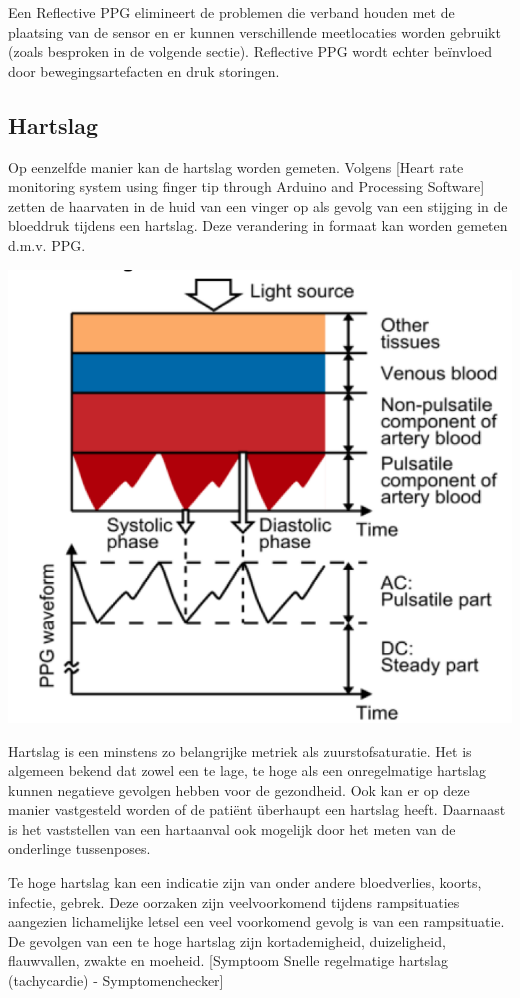 \documentclass[11pt]{article}
\begin{document}
    Een Reflective PPG elimineert de problemen die verband houden met de plaatsing van de sensor en er kunnen verschillende meetlocaties worden gebruikt (zoals besproken in de volgende sectie). 
    Reflective PPG wordt echter beïnvloed door bewegingsartefacten en druk storingen. 

    \subsection{Hartslag}
    Op eenzelfde manier kan de hartslag worden gemeten. 
    Volgens [Heart rate monitoring system using finger tip through Arduino and Processing Software] zetten de haarvaten in de huid van een vinger op als gevolg van een stijging in de bloeddruk tijdens een hartslag. 
    Deze verandering in formaat kan worden gemeten d.m.v. PPG.

    \includegraphics[height=0.5\textheight]{Images/Tamura2.png}

    
    Hartslag is een minstens zo belangrijke metriek als zuurstofsaturatie. Het is algemeen bekend dat zowel een te lage, te hoge als een onregelmatige hartslag kunnen negatieve gevolgen hebben voor de gezondheid. 
    Ook kan er op deze manier vastgesteld worden of de patiënt überhaupt een hartslag heeft.
    Daarnaast is het vaststellen van een hartaanval ook mogelijk door het meten van de onderlinge tussenposes. 

    Te hoge hartslag kan een indicatie zijn van onder andere bloedverlies, koorts, infectie, gebrek. 
    Deze oorzaken zijn veelvoorkomend tijdens rampsituaties aangezien lichamelijke letsel een veel voorkomend gevolg is van een rampsituatie. 
    De gevolgen van een te hoge hartslag zijn kortademigheid, duizeligheid, flauwvallen, zwakte en moeheid.
    [Symptoom Snelle regelmatige hartslag (tachycardie) - Symptomenchecker]
\end{document}
